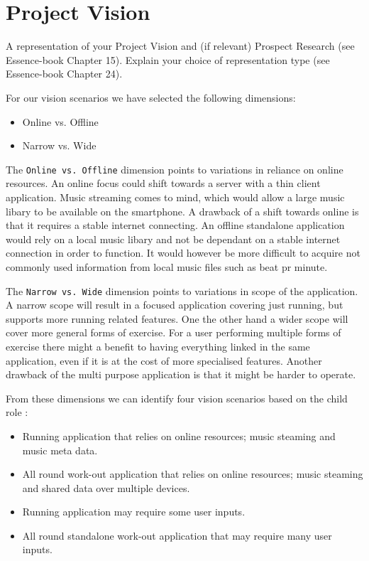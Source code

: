 \section{Project Vision}
A representation of your Project Vision and (if relevant) Prospect Research (see Essence-book Chapter 15).
Explain your choice of representation type (see Essence-book Chapter 24).

For our vision scenarios \cite[ p. 127]{essence} we have selected the following dimensions:
\begin{itemize}
\item Online vs. Offline %
\item Narrow vs. Wide
\end{itemize}

The \texttt{Online vs. Offline} dimension points to variations in reliance on online resources. An online focus could shift  towards a server with a thin client application. Music streaming comes to mind, which would allow a large music libary to be available on the smartphone. A drawback of a shift towards online is that it requires a stable internet connecting. An offline standalone application would rely on a local music libary and not be dependant on a stable internet connection in order to function. It would however be more difficult to acquire not commonly used information from local music files such as beat pr minute.


The \texttt{Narrow vs. Wide} dimension points to variations in scope of the application. A narrow scope will result in a focused application covering just running, but supports more running related features. One the other hand a wider scope will cover more general forms of exercise. For a user performing multiple forms of exercise there might a benefit to having everything linked in the same application, even if it is at the cost of more specialised features. Another drawback of the multi purpose application is that it might be harder to operate.



From these dimensions we can identify four vision scenarios based on the child role  \cite[ pp. 132-134]{essence}:

\begin{itemize}
\item Running application that relies on online resources; music steaming and music meta data. %
\item All round work-out application that relies on online resources; music steaming and shared data over multiple devices. %
\item Running application may require some user inputs. %
\item All round standalone work-out application that may require many user inputs. %
\end{itemize}

